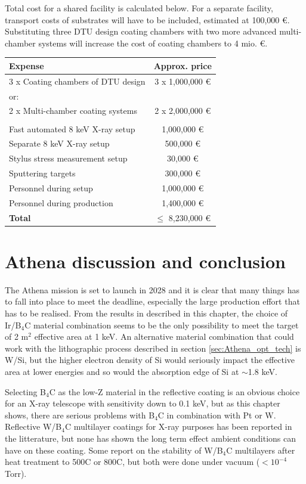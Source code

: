 Total cost for a shared facility is calculated below. For a separate facility, transport costs of substrates will have to be included, estimated at 100,000 \euro. Substituting three DTU design coating chambers with two more advanced multi-chamber systems will increase the cost of coating chambers to 4 mio. \euro.

\begin{table}[htbp]
	\centering
\begin{tabular}{l|c}
Expense & Approx. price\\
\hline
\hline
3 x Coating chambers of DTU design  & 3 x 1,000,000 \euro\\
\hline
or:\\
\hline
2 x Multi-chamber coating systems & 2 x 2,000,000 \euro \\
\hline
\\
\hline
Fast automated 8 keV X-ray setup  & 1,000,000 \euro\\
\hline
Separate 8 keV X-ray setup & 500,000 \euro\\
\hline
Stylus stress measurement setup & 30,000 \euro\\
\hline
Sputtering targets & 300,000 \euro\\
\hline
Personnel during setup & 1,000,000 \euro\\
\hline
Personnel during production & 1,400,000 \euro\\
\hline
\textbf{Total} & $\leq$ 8,230,000 \euro\\
\end{tabular}
\end{table}

\section{Athena discussion and conclusion}
The Athena mission is set to launch in 2028 and it is clear that many things has to fall into place to meet the deadline, especially the large production effort that has to be realised. From the results in described in this chapter, the choice of Ir/B$_4$C material combination seems to be the only possibility to meet the target of 2 m$^2$ effective area at 1 keV. An alternative material combination that could work with the lithographic process described in section \ref{sec:Athena_opt_tech} is W/Si, but the higher electron density of Si would seriously impact the effective area at lower energies and so would the absorption edge of Si at $\sim$1.8 keV.

Selecting B$_4$C as the low-Z material in the reflective coating is an obvious choice for an X-ray telescope with sensitivity down to 0.1 keV, but as this chapter shows, there are serious problems with B$_4$C in combination with Pt or W. Reflective W/B$_4$C multilayer coatings for X-ray purposes has been reported in the litterature\cite{Jankowski:1991kx,Morawe:2007vp}, but none has shown the long term effect ambient conditions can have on these coating. Some report on the stability of W/B$_4$C multilayers after heat treatment to 500\degr C\cite{JANKOWSKI:1990vd} or 800\degr C\cite{Rao:2013dt}, but both were done under vacuum ($<10^{-4}$ Torr).


